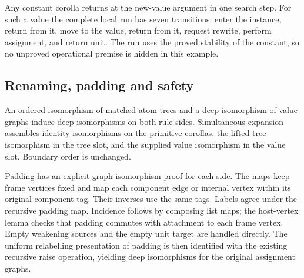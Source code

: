 


Any constant corolla returns at the new-value argument in one search step.
For such a value the complete local run has seven transitions: enter the
instance, return from it, move to the value, return from it, request rewrite,
perform assignment, and return unit. The run uses the proved stability of
the constant, so no unproved operational premise is hidden in this example.



\subsection{Renaming, padding and safety}

An ordered isomorphism of matched atom trees and a deep isomorphism of
value graphs induce deep isomorphisms on both rule sides. Simultaneous
expansion assembles identity isomorphisms on the primitive corollas, the
lifted tree isomorphism in the tree slot, and the supplied value isomorphism
in the value slot. Boundary order is unchanged.



Padding has an explicit graph-isomorphism proof for each side. The maps
keep frame vertices fixed and map each component edge or internal vertex
within its original component tag. Their inverses use the same tags. Labels
agree under the recursive padding map. Incidence follows by composing list
maps; the host-vertex lemma checks that padding commutes with attachment to
each frame vertex. Empty weakening sources and the empty unit target are
handled directly. The uniform relabelling presentation of padding is then
identified with the existing recursive raise operation, yielding deep
isomorphisms for the original assignment graphs.


